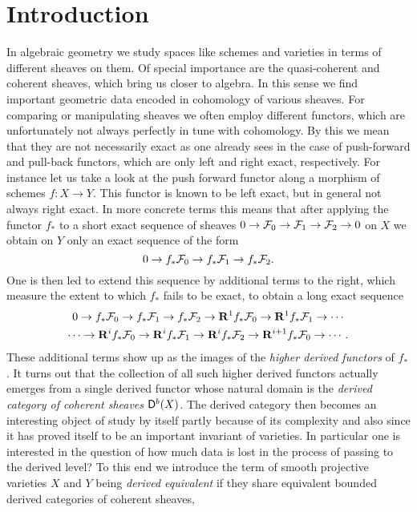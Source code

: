 \section*{Introduction}

In algebraic geometry we study spaces like schemes and varieties in terms of different sheaves on them. Of special importance are the quasi-coherent and coherent sheaves, which bring us closer to algebra. In this sense we find important geometric data encoded in cohomology of various sheaves. For comparing or manipulating sheaves we often employ different functors, which are unfortunately not always perfectly in tune with cohomology. By this we mean that they are not necessarily exact as one already sees in the case of push-forward and pull-back functors, which are only left and right exact, respectively.
For instance let us take a look at the push forward functor along a morphism of schemes $f \colon X \to Y$. This functor is known to be left exact, but in general not always right exact. In more concrete terms this means that after applying the functor $f_*$ to a short exact sequence of sheaves $0 \to \mathcal F_0 \to \mathcal F_1 \to \mathcal F_2 \to 0$ on $X$ we obtain on $Y$ only an exact sequence of the form
\[
    0 \to f_*\mathcal F_0 \to f_*\mathcal F_1 \to f_*\mathcal F_2.
\]
One is then led to extend this sequence by additional terms to the right, which measure the extent to which $f_*$ fails to be exact, to obtain a long exact sequence
\begin{multline*}
    0 \to f_*\mathcal F_0 \to f_*\mathcal F_1 \to f_*\mathcal F_2 \to \mathbf{R}^{1}f_*\mathcal F_0 \to \mathbf{R}^{1}f_*\mathcal F_1 \to \cdots \\
    \cdots \to \mathbf{R}^{i}f_*\mathcal F_0 \to \mathbf{R}^{i}f_*\mathcal F_1 \to \mathbf{R}^{i}f_*\mathcal F_2 \to \mathbf{R}^{i+1}f_*\mathcal F_0 \to \cdots.
\end{multline*}
These additional terms show up as the images of the \emph{higher derived functors} of $f_*$. It turns out that the collection of all such higher derived functors actually emerges from a single derived functor whose natural domain is the \emph{derived category of coherent sheaves} $\mathsf{D}^b(X)$. The derived category then becomes an interesting object of study by itself partly because of its complexity and also since it has proved itself to be an important invariant of varieties. In particular one is interested in the question of how much data is lost in the process of passing to the derived level? To this end we introduce the term of smooth projective varieties $X$ and $Y$ being \emph{derived equivalent} if they share equivalent bounded derived categories of coherent sheaves, \ie 
